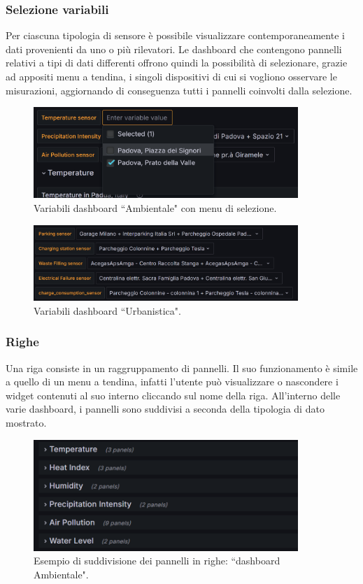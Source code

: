 \documentclass[8pt]{article}
\begin{document}
\subsubsection{Selezione variabili}
Per ciascuna tipologia di sensore è possibile visualizzare contemporaneamente i dati provenienti da uno o più rilevatori. Le dashboard che contengono pannelli relativi a tipi di dati differenti offrono quindi la possibilità di selezionare, grazie ad appositi menu a tendina, i singoli dispositivi di cui si vogliono osservare le misurazioni, aggiornando di conseguenza tutti i pannelli coinvolti dalla selezione. 
\begin{figure}[H]
        \centering
        \includegraphics[width=10cm]{images_mu/environmental_variables.png}
        \caption{Variabili dashboard ``Ambientale" con menu di selezione.}
        \label{fig:Variabili dashboard Ambientale con menu di selezione"}
    \end{figure}
    \begin{figure}[H]
        \centering
        \includegraphics[width=10cm]{images_mu/urban_variables.png}
        \caption{Variabili dashboard ``Urbanistica".}
        \label{fig:Variabili dashboard urbanistica"}
    \end{figure}
\subsubsection{Righe}
Una riga consiste in un raggruppamento di pannelli. Il suo funzionamento è simile a quello di un menu a tendina, infatti l'utente può visualizzare o nascondere i widget contenuti al suo interno cliccando sul nome della riga. All'interno delle varie dashboard, i pannelli sono suddivisi a seconda della tipologia di dato mostrato. 
\begin{figure}[H]
    \centering
    \includegraphics[width=10cm]{images_mu/rows.png}
    \caption{Esempio di suddivisione dei pannelli in righe: ``dashboard Ambientale".}
    \label{fig:Esempio di suddivisione dei pannelli in righe: ``dashboard Ambientale"}
\end{figure}
\end{document}

